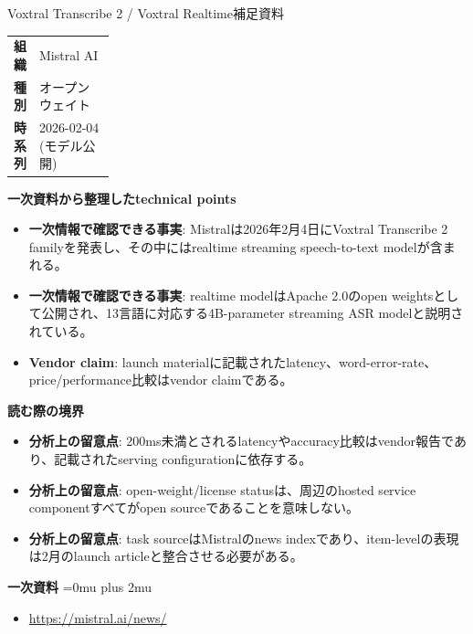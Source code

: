 \begin{technicalnote}{Voxtral Transcribe 2 / Voxtral Realtime}{補足資料}
\begingroup
\begin{tabularx}{\linewidth}{@{}>{\bfseries}p{0.22\linewidth}X@{}}
組織 & Mistral AI \\
種別 & オープンウェイト \\
時系列 & 2026-02-04 (モデル公開) \\
\end{tabularx}
\smallskip
{\bfseries 一次資料から整理したtechnical points}
\begin{itemize}[leftmargin=1.5em,itemsep=0.35em]
\item \textbf{一次情報で確認できる事実}: Mistralは2026年2月4日にVoxtral Transcribe 2 familyを発表し、その中にはrealtime streaming speech-to-text modelが含まれる。
\item \textbf{一次情報で確認できる事実}: realtime modelはApache 2.0のopen weightsとして公開され、13言語に対応する4B-parameter streaming ASR modelと説明されている。
\item \textbf{Vendor claim}: launch materialに記載されたlatency、word-error-rate、price/performance比較はvendor claimである。
\end{itemize}
\begin{minipage}{\linewidth}
{\bfseries 読む際の境界}
\begin{itemize}[leftmargin=1.5em,itemsep=0.35em]
\item \textbf{分析上の留意点}: 200ms未満とされるlatencyやaccuracy比較はvendor報告であり、記載されたserving configurationに依存する。
\item \textbf{分析上の留意点}: open-weight/license statusは、周辺のhosted service componentすべてがopen sourceであることを意味しない。
\item \textbf{分析上の留意点}: task sourceはMistralのnews indexであり、item-levelの表現は2月のlaunch articleと整合させる必要がある。
\end{itemize}
\begin{samepage}
{\bfseries 一次資料}
\begingroup\sloppy
\Urlmuskip=0mu plus 2mu\relax
\begin{itemize}[leftmargin=1.5em,itemsep=0.25em]
\item {\scriptsize\url{https://mistral.ai/news/}}
\end{itemize}
\endgroup
\end{samepage}
\end{minipage}
\endgroup
\end{technicalnote}
\medskip

